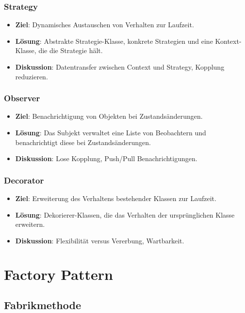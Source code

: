 \documentclass[11pt, a4paper]{article}
\begin{document}
\subsubsection{Strategy}
\begin{itemize}
    \item \textbf{Ziel}: Dynamisches Austauschen von Verhalten zur Laufzeit.
    \item \textbf{Lösung}: Abstrakte Strategie-Klasse, konkrete Strategien und eine Kontext-Klasse, die die Strategie hält.
    \item \textbf{Diskussion}: Datentransfer zwischen Context und Strategy, Kopplung reduzieren.
\end{itemize}

\subsubsection{Observer}
\begin{itemize}
    \item \textbf{Ziel}: Benachrichtigung von Objekten bei Zustandsänderungen.
    \item \textbf{Lösung}: Das Subjekt verwaltet eine Liste von Beobachtern und benachrichtigt diese bei Zustandsänderungen.
    \item \textbf{Diskussion}: Lose Kopplung, Push/Pull Benachrichtigungen.
\end{itemize}

\subsubsection{Decorator}
\begin{itemize}
    \item \textbf{Ziel}: Erweiterung des Verhaltens bestehender Klassen zur Laufzeit.
    \item \textbf{Lösung}: Dekorierer-Klassen, die das Verhalten der ursprünglichen Klasse erweitern.
    \item \textbf{Diskussion}: Flexibilität versus Vererbung, Wartbarkeit.
\end{itemize}

\newpage


\section{Factory Pattern} %

\subsection{Fabrikmethode}
\end{document}
